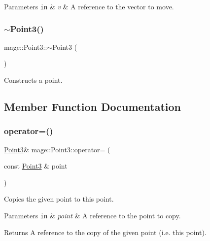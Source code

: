 \begin{DoxyParams}[1]{Parameters}
\mbox{\tt in}  & {\em v} & A reference to the vector to move. \\
\hline
\end{DoxyParams}
\hypertarget{structmage_1_1_point3_a952151b6ff72b68569f95445c2ac2495}{}\label{structmage_1_1_point3_a952151b6ff72b68569f95445c2ac2495} 
\subsubsection{\texorpdfstring{$\sim$\+Point3()}{~Point3()}}
{\footnotesize\ttfamily mage\+::\+Point3\+::$\sim$\+Point3 (\begin{DoxyParamCaption}{ }\end{DoxyParamCaption})\hspace{0.3cm}{\ttfamily [default]}}

Constructs a point. 

\subsection{Member Function Documentation}
\hypertarget{structmage_1_1_point3_a9b2178183cdb9e8d1ab6eaf9702b0786}{}\label{structmage_1_1_point3_a9b2178183cdb9e8d1ab6eaf9702b0786} 
\subsubsection{\texorpdfstring{operator=()}{operator=()}\hspace{0.1cm}{\footnotesize\ttfamily [1/2]}}
{\footnotesize\ttfamily \hyperlink{structmage_1_1_point3}{Point3}\& mage\+::\+Point3\+::operator= (\begin{DoxyParamCaption}\item[{const \hyperlink{structmage_1_1_point3}{Point3} \&}]{point }\end{DoxyParamCaption})\hspace{0.3cm}{\ttfamily [default]}}

Copies the given point to this point.


\begin{DoxyParams}[1]{Parameters}
\mbox{\tt in}  & {\em point} & A reference to the point to copy. \\
\hline
\end{DoxyParams}
\begin{DoxyReturn}{Returns}
A reference to the copy of the given point (i.\+e. this point). 
\end{DoxyReturn}
\hypertarget{structmage_1_1_point3_ab3a12f78a196535f25269e1288b10a06}{}\label{structmage_1_1_point3_ab3a12f78a196535f25269e1288b10a06} 
